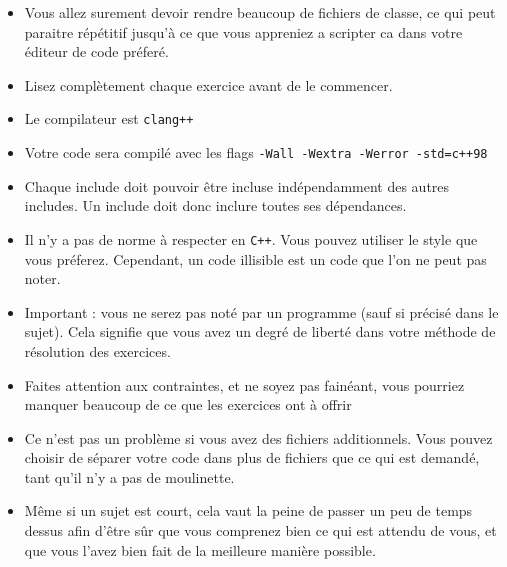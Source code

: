 \begin{itemize}
        \item Vous allez surement devoir rendre beaucoup de fichiers de classe,
          ce qui peut paraitre répétitif jusqu'à ce que vous appreniez a scripter
          ca dans votre éditeur de code préferé.
        \item Lisez complètement chaque exercice avant de le commencer.
        \item Le compilateur est \texttt{clang++}
        \item Votre code sera compilé avec les flags \texttt{-Wall -Wextra -Werror -std=c++98}
        \item Chaque include doit pouvoir être incluse indépendamment des autres includes.
          Un include doit donc inclure toutes ses dépendances.
        \item Il n'y a pas de norme à respecter en \texttt{C++}. Vous pouvez utiliser 
          le style que vous préferez. Cependant, un code illisible est un code 
          que l'on ne peut pas noter.
        \item Important : vous ne serez pas noté par un programme (sauf si précisé
          dans le sujet). Cela signifie que vous avez un degré de liberté dans 
          votre méthode de résolution des exercices. 
        \item Faites attention aux contraintes, et ne soyez pas fainéant, vous pourriez
          manquer beaucoup de ce que les exercices ont à offrir
        \item Ce n'est pas un problème si vous avez des fichiers additionnels. Vous pouvez 
          choisir de séparer votre code dans plus de fichiers que ce qui est demandé, 
          tant qu'il n'y a pas de moulinette.
        \item Même si un sujet est court, cela vaut la peine de passer un peu de temps dessus
          afin d'être sûr que vous comprenez bien ce qui est attendu de vous, et que vous l'avez 
          bien fait de la meilleure manière possible.

\end{itemize}

\newpage
